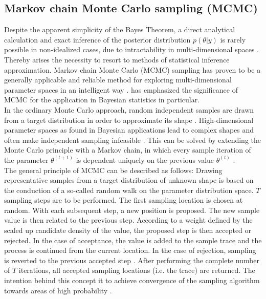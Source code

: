         \subsection{Markov chain Monte Carlo sampling (MCMC)}\label{sec:mcmc}
        Despite the apparent simplicity of the Bayes Theorem, a direct analytical calculation and exact inference of the posterior distribution $p(\theta|y)$ is rarely possible in non-idealized cases, due to intractability in multi-dimensional spaces \citep{hoffman2014no, delaVarga2016}. Thereby arises the necessity to resort to methods of statistical inference approximation. Markov chain Monte Carlo (MCMC) sampling has proven to be a generally applicable and reliable method for exploring multi-dimensional parameter spaces in an intelligent way \citep{hoffman2014no, davidson2015}. \citet{gilks2005markov} has emphasized the significance of MCMC for the application in Bayesian statistics in particular.\\
        In the ordinary Monte Carlo approach, random independent samples are drawn from a target distribution in order to approximate its shape \citep{gilks2005markov, delaVarga2016}. High-dimensional parameter spaces as found in Bayesian applications lead to complex shapes and often make independent sampling infeasible \citep{gilks2005markov}. This can be solved by extending the Monte Carlo principle with a Markov chain, in which every sample iteration of the parameter $\theta^{(t+1)}$ is dependent uniquely on the previous value $\theta^{(t)}$ \citep{gilks2005markov, delaVarga2016}.\\
        The general principle of MCMC can be described as follows: 
        Drawing representative samples from a target distribution of unknown shape is based on the conduction of a so-called random walk on the parameter distribution space. $T$ sampling steps are to be performed. The first sampling location is chosen at random. With each subsequent step, a new position is proposed. The new sample value is then related to the previous step. According to a weight defined by the scaled up candidate density of the value, the proposed step is then accepted or rejected. In the case of acceptance, the value is added to the sample trace and the process is continued from the current location. In the case of rejection, sampling is reverted to the previous accepted step \citep{schaaf2017, delaVarga2016}. After performing the complete number of $T$ iterations, all accepted sampling locations (i.e. the trace) are returned. The intention behind this concept it to achieve convergence of the sampling algorithm towards areas of high probability \citep{davidson2015}.\\ 
